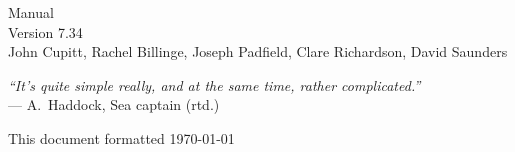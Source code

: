 \documentclass[a4paper,twocolumn,dvips]{book}
\begin{document}

\begin{titlepage}
\thispagestyle{empty}
\begin{center}
\huge
\nip{} Manual\\[0.2em]
\large Version 7.34\\
\vspace{0.5in}
\large
John Cupitt, 
Rachel Billinge,
Joseph Padfield, 
Clare Richardson, 
David Saunders\\ 
\end{center}

\vspace{3in}

\begin{center}
\noindent
\emph{``It's quite simple really, and at the same time, rather 
complicated.''} \\
--- A.\ Haddock, Sea captain (rtd.)
\end{center}

\vspace{3in}

\noindent
\small{This document formatted \today}
\setcounter{page}{1}
\end{titlepage}

\tableofcontents
\thispagestyle{plain}

\listoffigures
\thispagestyle{plain}

\listoftables
\thispagestyle{plain}

\blankpage
{}
\thispagestyle{plain}
\cfoot{}







\appendix

\end{document}
